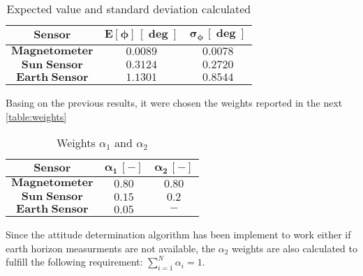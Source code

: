 \begin{table}[H]

    \centering
    \begin{tabular}{|c|c|c|}
    \hline
    $\bm{Sensor}$ & $\bm{E\left[\phi\right]\, [\deg]}$ & $\bm{\sigma_{\phi} \, [\deg]}$ \\
    \hline
    $\bm{Magnetometer}$ & $0.0089$ & $0.0078$  \\
    \hline
    $\bm{Sun\;Sensor}$ & $0.3124$ & $0.2720$  \\
    \hline
    $\bm{Earth\;Sensor}$ & $1.1301$ & $0.8544$  \\
    \hline
    \end{tabular}
    
    \caption{Expected value and standard deviation calculated}
    \label{table:exp_std}
    
\end{table}

Basing on the previous results, it were chosen the weights reported in the next \autoref{table:weights}

\begin{table}[H]

    \centering
    \begin{tabular}{|c|c|c|}
    \hline
    $\bm{Sensor}$ & $\bm{\alpha_{1}\, [-]}$ & $\bm{\alpha_{2} \, [-]}$ \\
    \hline
    $\bm{Magnetometer}$ & $0.80$ & $0.80$  \\
    \hline
    $\bm{Sun\;Sensor}$ & $0.15$ & $0.2$  \\
    \hline
    $\bm{Earth\;Sensor}$ & $0.05$ & $\bm{-}$  \\
    \hline
    \end{tabular}
    
    \caption{Weights $\alpha_{1}$ and $\alpha_{2}$}
    \label{table:weights}
    
\end{table}

Since the attitude determination algorithm has been implement to work either if earth horizon measurments are not available, the $\alpha_2$ weights are also calculated to fulfill the following requirement: $\sum_{i=1}^N\alpha_i=1$.